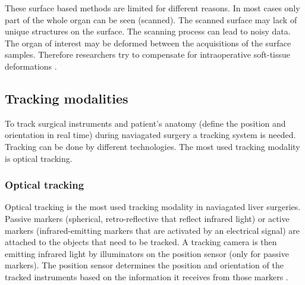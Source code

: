 These surface based methods are limited for different reasons. In most cases
only part of the whole organ can be seen (scanned). The scanned surface may lack
of unique structures on the surface. The scanning process can 
lead to noisy data. The organ of interest may be deformed between the
acquisitions of the surface samples. Therefore researchers try to compensate for
intraoperative soft-tissue deformations \cite{cash2005compensating}\cite{dagon2008real}.
\subsection{Tracking modalities}
To track surgical instruments and patient's anatomy (define the position and
orientation in real time) during naviagated surgery a tracking system is needed.
Tracking can be done by different technologies. The most used tracking
modality is optical tracking. 

\subsubsection{Optical tracking}
Optical tracking is the most used tracking modality in naviagated liver
surgeries. Passive markers (spherical, retro-reflective that reflect infrared
light) or active markers (infrared-emitting markers that are activated by an
electrical signal) \cite{wiles2004accuracy} are attached to the objects that
need to be tracked. A tracking camera is then emitting infrared light by illuminators
on the position sensor (only for passive markers). The position sensor
determines the position and orientation of the tracked instruments based on the
information it receives from those markers \cite{noauthor_polaris_nodate}.  
\endinput
